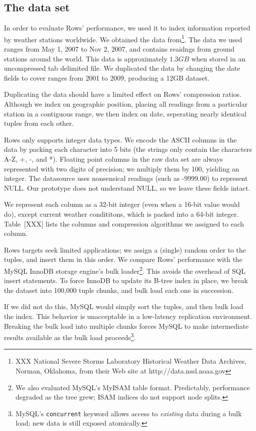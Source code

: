 \documentclass{sig-alternate-sigmod08}
\newcommand{\rows}{Rows\xspace}
\newcommand{\rowss}{Rows'\xspace}
\begin{document}
\subsection{The data set}

In order to evaluate \rowss performance, we used it to index
information reported by weather stations worldwide.  We obtained the
data from\footnote{XXX National Severe Storms Laboratory Historical
  Weather Data Archives, Norman, Oklahoma, from their Web site at
  http://data.nssl.noaa.gov}.  The data we used ranges from May 1,
2007 to Nov 2, 2007, and contains reaidngs from ground stations around
the world.  This data is approximately $1.3GB$ when stored in an
uncompressed tab delimited file.  We duplicated the data by changing
the date fields to cover ranges from 2001 to 2009, producing a 12GB
dataset.

Duplicating the data should have a limited effect on \rowss
compression ratios.  Although we index on geographic position, placing
all readings from a particular station in a contiguous range, we then
index on date, seperating nearly identical tuples from each other.

\rows only supports integer data types.  We encode the ASCII columns
in the data by packing each character into 5 bits (the strings only
contain the characters A-Z, +, -, and *).  Floating point columns in
the raw data set are always represented with two digits of precision;
we multiply them by 100, yielding an integer.  The datasource uses
nonsensical readings (such as -9999.00) to represent NULL.  Our
prototype does not understand NULL, so we leave these fields intact.

We represent each column as a 32-bit integer (even when a 16-bit value
would do), except current weather condititons, which is packed into a
64-bit integer.  Table~[XXX] lists the columns and compression
algorithms we assigned to each column.

\rows targets seek limited applications; we assign a (single) random
order to the tuples, and insert them in this order.  We compare \rowss
performance with the MySQL InnoDB storage engine's bulk
loader\footnote{We also evaluated MySQL's MyISAM table format.
  Predictably, performance degraded as the tree grew; ISAM indices do not
  support node splits.}.  This avoids the overhead of SQL insert
statements.  To force InnoDB to update its B-tree index in place, we
break the dataset into 100,000 tuple chunks, and bulk load each one in
succession.

If we did not do this, MySQL would simply sort the tuples, and then
bulk load the index.  This behavior is unacceptable in a low-latency
replication environment.  Breaking the bulk load into multiple chunks
forces MySQL to make intermediate results available as the bulk load
proceeds\footnote{MySQL's {\tt concurrent} keyword allows access to
  {\em existing} data during a bulk load; new data is still exposed
  atomically.}.
\end{document}
